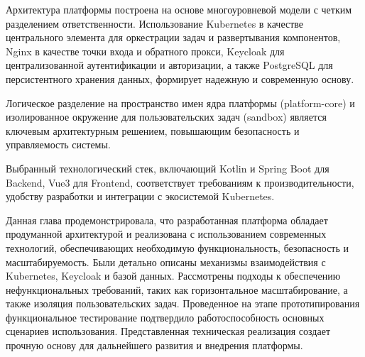 Архитектура платформы построена на основе многоуровневой модели с четким разделением ответственности. Использование Kubernetes в качестве центрального элемента для оркестрации задач и развертывания компонентов, Nginx в качестве точки входа и обратного прокси, Keycloak для централизованной аутентификации и авторизации, а также PostgreSQL для персистентного хранения данных, формирует надежную и современную основу.

Логическое разделение на пространство имен ядра платформы (platform-core) и изолированное окружение для пользовательских задач (sandbox) является ключевым архитектурным решением, повышающим безопасность и управляемость системы.

Выбранный технологический стек, включающий Kotlin и Spring Boot для Backend, Vue3 для Frontend, соответствует требованиям к производительности, удобству разработки и интеграции с экосистемой Kubernetes.

Данная глава продемонстрировала, что разработанная платформа обладает продуманной архитектурой и реализована с использованием современных технологий, обеспечивающих необходимую функциональность, безопасность и масштабируемость. Были детально описаны механизмы взаимодействия с Kubernetes, Keycloak и базой данных. Рассмотрены подходы к обеспечению нефункциональных требований, таких как горизонтальное масштабирование, а также изоляция пользовательских задач. Проведенное на этапе прототипирования функциональное тестирование подтвердило работоспособность основных сценариев использования. Представленная техническая реализация создает прочную основу для дальнейшего развития и внедрения платформы.
